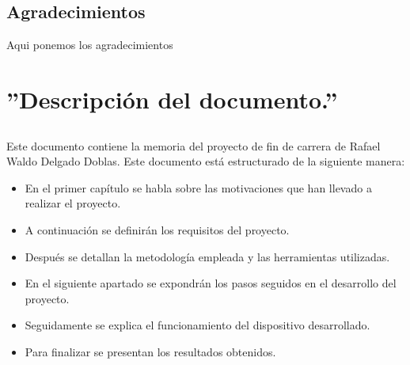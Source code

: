 \documentclass[a4paper,12pt,titlepage,final]{book}
\begin{document}
\maketitle

\newpage
\thispagestyle{empty}
\section*{Agradecimientos}
Aqui ponemos los agradecimientos

\tableofcontents

\mainmatter
\chapter{''Descripción del documento.''}
\section*{}
\subsection*{}
\subsubsection*{}

\paragraph{}
Este documento contiene la memoria del proyecto de fin de carrera de Rafael Waldo Delgado Doblas. Este documento está estructurado de la siguiente manera:

\begin{itemize}
  \item En el primer capítulo se habla sobre las motivaciones que han llevado a realizar el proyecto.
  \item A continuación se definirán los requisitos del proyecto.
  \item Después se detallan la metodología empleada y las herramientas utilizadas.
  \item En el siguiente apartado se expondrán los pasos seguidos en el desarrollo del proyecto.
  \item Seguidamente se explica el funcionamiento del dispositivo desarrollado.
  \item Para finalizar se presentan los resultados obtenidos.
\end{itemize}
\end{document}
